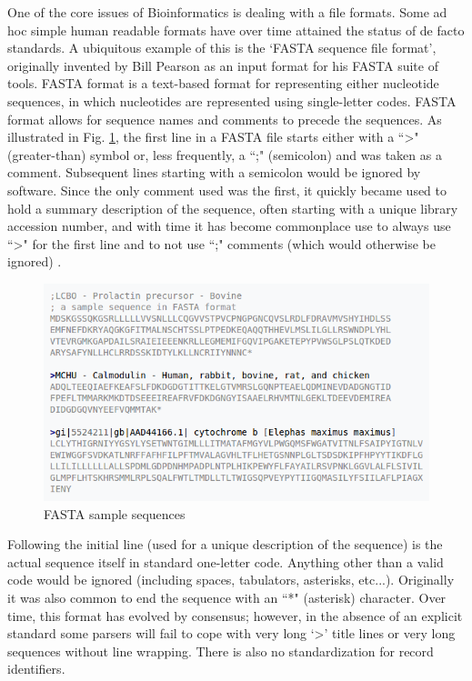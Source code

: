\documentclass[12pt,openany]{llncs}
\begin{document}
\newpage
One of the core issues of Bioinformatics is dealing with a file formats. Some ad hoc simple human readable formats have over time attained the status of de facto standards. A ubiquitous example of this is the ‘FASTA sequence file format’, originally invented by Bill Pearson as an input format for his FASTA suite of tools.
FASTA format is a text-based format for representing either nucleotide sequences, in which nucleotides are represented using single-letter codes. FASTA format allows for sequence names and comments to precede the sequences. As illustrated in Fig. \ref{fig:fig-NGS-5}, the first line in a FASTA file starts either with a ``\textgreater" (greater-than) symbol or, less frequently, a ``;" (semicolon) and was taken as a comment. Subsequent lines starting with a semicolon would be ignored by software. Since the only comment used was the first, it quickly became used to hold a summary description of the sequence, often starting with a unique library accession number, and with time it has become commonplace use to always use ``\textgreater" for the first line and to not use ``;" comments (which would otherwise be ignored) \cite{fasta-fastq1}.
\begin{figure}
	\centering
	\includegraphics[width=.911\linewidth]{./figs/NGS-5}
	\caption{\label{fig:fig-NGS-5}FASTA sample sequences}
\end{figure}
Following the initial line (used for a unique description of the sequence) is the actual sequence itself in standard one-letter code. Anything other than a valid code would be ignored (including spaces, tabulators, asterisks, etc...). Originally it was also common to end the sequence with an ``*" (asterisk) character. 
Over time, this format has evolved by consensus; however, in the absence of an explicit standard some parsers will fail to cope with very long ‘\textgreater’ title lines or very long sequences without line wrapping. There is also no standardization for record identifiers.
\end{document}
